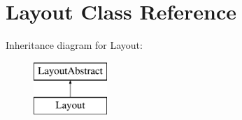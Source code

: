 \hypertarget{class_anemo_1_1_layout}{
\section{Layout Class Reference}
\label{class_anemo_1_1_layout}
}
Inheritance diagram for Layout:\begin{figure}[H]
\begin{center}
\leavevmode
\includegraphics[height=2.000000cm]{class_anemo_1_1_layout}
\end{center}
\end{figure}
